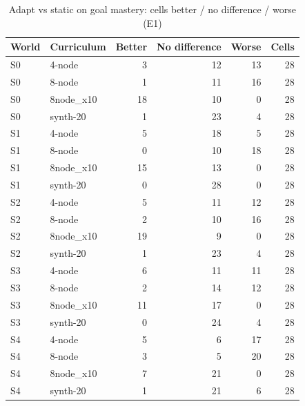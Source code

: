 \begin{table}[htbp]
\centering\small
\caption{Adapt vs static on goal mastery: cells better / no difference / worse (E1)}
\label{tab:t8}
\begin{tabular}{llrrrr}
\toprule
World & Curriculum & Better & No difference & Worse & Cells \\
\midrule
S0 & 4-node & 3 & 12 & 13 & 28 \\
S0 & 8-node & 1 & 11 & 16 & 28 \\
S0 & 8node\_x10 & 18 & 10 & 0 & 28 \\
S0 & synth-20 & 1 & 23 & 4 & 28 \\
S1 & 4-node & 5 & 18 & 5 & 28 \\
S1 & 8-node & 0 & 10 & 18 & 28 \\
S1 & 8node\_x10 & 15 & 13 & 0 & 28 \\
S1 & synth-20 & 0 & 28 & 0 & 28 \\
S2 & 4-node & 5 & 11 & 12 & 28 \\
S2 & 8-node & 2 & 10 & 16 & 28 \\
S2 & 8node\_x10 & 19 & 9 & 0 & 28 \\
S2 & synth-20 & 1 & 23 & 4 & 28 \\
S3 & 4-node & 6 & 11 & 11 & 28 \\
S3 & 8-node & 2 & 14 & 12 & 28 \\
S3 & 8node\_x10 & 11 & 17 & 0 & 28 \\
S3 & synth-20 & 0 & 24 & 4 & 28 \\
S4 & 4-node & 5 & 6 & 17 & 28 \\
S4 & 8-node & 3 & 5 & 20 & 28 \\
S4 & 8node\_x10 & 7 & 21 & 0 & 28 \\
S4 & synth-20 & 1 & 21 & 6 & 28 \\
\bottomrule
\end{tabular}
\end{table}
